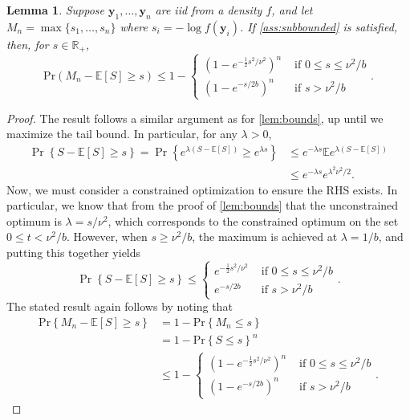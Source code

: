 \documentclass[a4paper,11pt]{article}
\newcommand{\E}{\mathbb{E}}
\newtheorem{lemma}{Lemma}
\begin{document}
\begin{lemma}\label{lem:bounds_sub}
	Suppose $\bm{y}_1,\dots,\bm{y}_n$ are iid from a density $f$, and let $M_n = \max\{s_1,\dots,s_n\}$ where $s_i = -\log f(\bm{y}_i)$. If \cref{ass:subbounded} is satisfied, then, for $s\in\mathbb{R}_+$,
	$$
		\mathrm{Pr}\left(M_n-\E[S]\ge s\right)\le 1-
		\begin{cases}
			(1-e^{-\frac{1}{2}s^2/\nu^2})^n & \text{ if }0\le s\le \nu^2/b \\
			(1-e^{-s/2b})^n                 & \text{ if }s>\nu^2/b
		\end{cases}.
	$$
\end{lemma}
\begin{proof}
	The result follows a similar argument as for \cref{lem:bounds}, up until we maximize the tail bound. In particular, for any $\lambda>0$,
	\begin{align*}
		\Pr\left\{ S-\E[S]\ge s\right\} =
		\Pr\left\{e^{\lambda (S-\E[S])}\ge e^{\lambda s}\right\}
		 & \le e^{-\lambda s}\E e^{\lambda (S-\E[S])} \\
		 & \le e^{-\lambda s}e^{\lambda^2\nu^2/2} .
	\end{align*}
	Now, we must consider a constrained optimization to ensure the RHS exists. In particular, we know that from the proof of \cref{lem:bounds} that the unconstrained optimum is $\lambda=s/\nu^2$, which corresponds to the constrained optimum on the set $0\le t<\nu^2/b$. However, when $s\ge \nu^2/b$, the maximum is achieved at $\lambda=1/b$, and putting this together yields
	$$
		\Pr\left\{S-\E[S]\ge s\right\}\le
		\begin{cases}
			e^{-\frac{1}{2}s^2/\nu^2} & \text{ if }0\le s\le \nu^2/b \\
			e^{-s/2b}                 & \text{ if } s>\nu^2/b
		\end{cases}.
	$$
	The stated result again follows by noting that
	\begin{align*}
		\mathrm{Pr}\left\{M_n-\E[S]\ge s\right\}
		 & = 1-\mathrm{Pr}\left\{M_n\le s\right\} \\
		 & = 1-\mathrm{Pr}\left\{S\le s\right\}^n \\
		 & \le 1-
		\begin{cases}
			(1-e^{-\frac{1}{2}s^2/\nu^2})^n & \text{ if } 0\le s\le \nu^2/b \\
			(1-e^{-s/2b})^n                 & \text{ if } s>\nu^2/b
		\end{cases}.
	\end{align*}
\end{proof}
\end{document}
